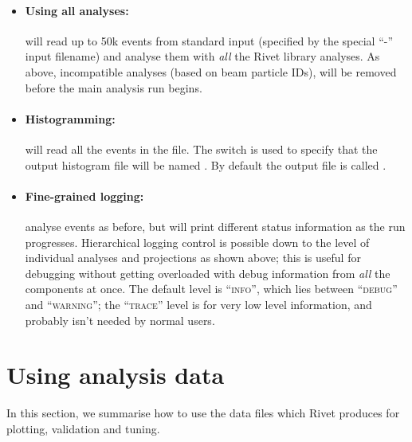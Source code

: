 \documentclass{JHEP3}
\begin{document}
\begin{itemize}
\item \paragraph{Using all analyses:}{ will read up to 
    50k events from standard input (specified by the special ``-'' input filename) 
    and analyse them with \emph{all} the Rivet library analyses. As above, 
    incompatible analyses (based on beam particle IDs), will be removed before 
    the main analysis run begins.}

\item \paragraph{Histogramming:}{ will read all the
    events in the  file. The  switch is used to specify
    that the output histogram file will be named . By default the
    output file is called .}

\item \paragraph{Fine-grained logging:}{ analyse events as before, but will print different status
    information as the run progresses. Hierarchical logging control is possible
    down to the level of individual analyses and projections as shown above;
    this is useful for debugging without getting overloaded with debug
    information from \emph{all} the components at once. The default level is
    ``\textsc{info}'', which lies between ``\textsc{debug}'' and
    ``\textsc{warning}''; the ``\textsc{trace}'' level is for very low level
    information, and probably isn't needed by normal users.}

\end{itemize}



\section{Using analysis data}

In this section, we summarise how to use the data files which Rivet produces for
plotting, validation and tuning.
\end{document}
